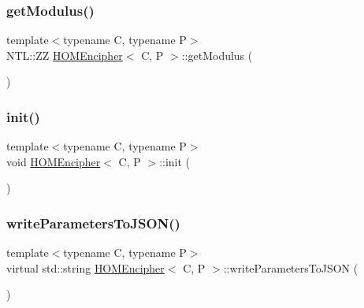 \mbox{\label{classHOMEncipher_a43f920fd7feb8f3c9c6532c4935a6922}} 
\subsubsection{\texorpdfstring{get\+Modulus()}{getModulus()}}
{\footnotesize\ttfamily template$<$typename C, typename P$>$ \\
N\+T\+L\+::\+ZZ \hyperlink{classHOMEncipher}{H\+O\+M\+Encipher}$<$ C, P $>$\+::get\+Modulus (\begin{DoxyParamCaption}{ }\end{DoxyParamCaption})\hspace{0.3cm}{\ttfamily [inline]}}

\mbox{\label{classHOMEncipher_aefdaccfe94ca8bd67a3ed1f5f045b04a}} 
\subsubsection{\texorpdfstring{init()}{init()}}
{\footnotesize\ttfamily template$<$typename C, typename P$>$ \\
void \hyperlink{classHOMEncipher}{H\+O\+M\+Encipher}$<$ C, P $>$\+::init (\begin{DoxyParamCaption}{ }\end{DoxyParamCaption})\hspace{0.3cm}{\ttfamily [inline]}}

\mbox{\label{classHOMEncipher_abf176e3fb85de6f0f6a2c96563397d39}} 
\subsubsection{\texorpdfstring{write\+Parameters\+To\+J\+S\+O\+N()}{writeParametersToJSON()}}
{\footnotesize\ttfamily template$<$typename C, typename P$>$ \\
virtual std\+::string \hyperlink{classHOMEncipher}{H\+O\+M\+Encipher}$<$ C, P $>$\+::write\+Parameters\+To\+J\+S\+ON (\begin{DoxyParamCaption}{ }\end{DoxyParamCaption})\hspace{0.3cm}{\ttfamily [pure virtual]}}



